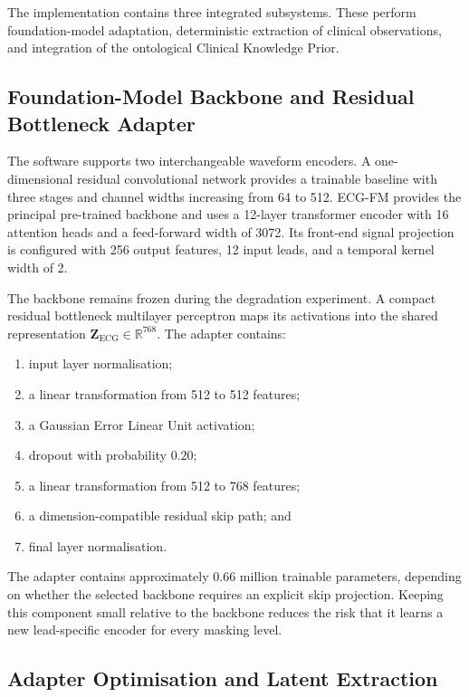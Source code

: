 \documentclass{ssnreview}
\begin{document}
The implementation contains three integrated subsystems. These perform foundation-model
adaptation, deterministic extraction of clinical observations, and integration of the
ontological Clinical Knowledge Prior.

\subsection{Foundation-Model Backbone and Residual Bottleneck Adapter}

The software supports two interchangeable waveform encoders. A one-dimensional residual
convolutional network provides a trainable baseline with three stages and channel widths
increasing from 64 to 512. ECG-FM provides the principal pre-trained backbone and uses a
12-layer transformer encoder with 16 attention heads and a feed-forward width of 3072.
Its front-end signal projection is configured with 256 output features, 12 input leads, and
a temporal kernel width of 2.

The backbone remains frozen during the degradation experiment. A compact residual
bottleneck multilayer perceptron maps its activations into the shared representation
$\mathbf{Z}_{\mathrm{ECG}}\in\mathbb{R}^{768}$. The adapter contains:

\begin{enumerate}[label=\arabic*.,leftmargin=*,align=left]
  \item input layer normalisation;
  \item a linear transformation from 512 to 512 features;
  \item a Gaussian Error Linear Unit activation;
  \item dropout with probability $0.20$;
  \item a linear transformation from 512 to 768 features;
  \item a dimension-compatible residual skip path; and
  \item final layer normalisation.
\end{enumerate}

The adapter contains approximately $0.66$ million trainable parameters, depending on
whether the selected backbone requires an explicit skip projection. Keeping this component
small relative to the backbone reduces the risk that it learns a new lead-specific encoder
for every masking level.

\subsection{Adapter Optimisation and Latent Extraction}
\end{document}

